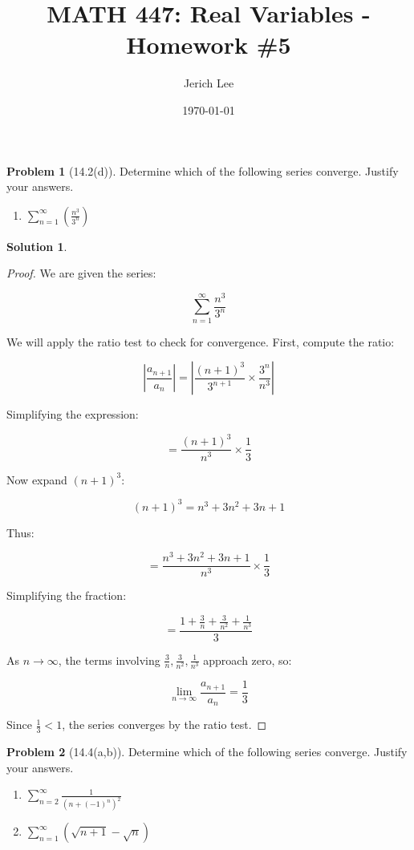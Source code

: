 \documentclass[12pt]{article}
\title{MATH 447: Real Variables - Homework \#5}
\author{Jerich Lee}
\date{\today}
\theoremstyle{definition} %
\newtheorem{solution}{Solution}
\newtheorem{problem}{Problem}
\theoremstyle{plain} %
\begin{document}
\maketitle
\begin{problem}[14.2(d)]
   Determine which of the following series converge. Justify your answers.
   \begin{enumerate}
    \item \(\sum_{n=1}^{\infty} (\frac{n^{3}}{3^{n} })\) 
   \end{enumerate} 
\end{problem}
\begin{solution}
   \begin{proof}
      We are given the series:

\[
\sum_{n=1}^{\infty} \frac{n^3}{3^n}
\]

We will apply the ratio test to check for convergence. First, compute the ratio:

\[
\left| \frac{a_{n+1}}{a_n} \right| = \left| \frac{(n+1)^3}{3^{n+1}} \times \frac{3^n}{n^3} \right|
\]

Simplifying the expression:

\[
= \frac{(n+1)^3}{n^3} \times \frac{1}{3}
\]

Now expand \((n+1)^3\):

\[
(n+1)^3 = n^3 + 3n^2 + 3n + 1
\]

Thus:

\[
= \frac{n^3 + 3n^2 + 3n + 1}{n^3} \times \frac{1}{3}
\]

Simplifying the fraction:

\[
= \frac{1 + \frac{3}{n} + \frac{3}{n^2} + \frac{1}{n^3}}{3}
\]

As \( n \to \infty \), the terms involving \( \frac{3}{n}, \frac{3}{n^2}, \frac{1}{n^3} \) approach zero, so:

\[
\lim_{n \to \infty} \frac{a_{n+1}}{a_n} = \frac{1}{3}
\]

Since \( \frac{1}{3} < 1 \), the series converges by the ratio test.




   \end{proof}

\end{solution}
\begin{problem}[14.4(a,b)]
   Determine which of the following series converge. Justify your answers.
\begin{enumerate}
    \item \(\sum_{n=2}^{\infty} \frac{1}{\left( n+(-1)^{n}  \right)^{2}  }\) 
    \item \(\sum_{n=1}^{\infty}\left( \sqrt{n+1}-\sqrt{n}   \right)  \) 
\end{enumerate}
    
\end{problem}
\end{document}
